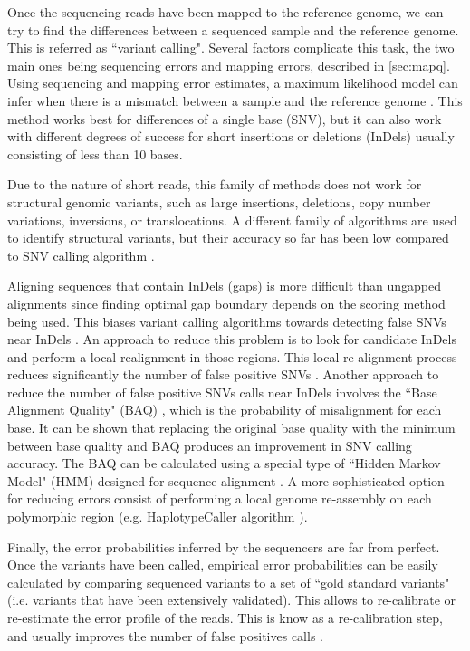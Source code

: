 Once the sequencing reads have been mapped to the reference genome, we can try to find the differences between a sequenced sample and the reference genome.  This is referred as  ``variant calling".  Several factors complicate this task, the two main ones being sequencing errors and mapping errors, described in \ref{sec:mapq}.  Using sequencing and mapping error estimates, a maximum likelihood model can infer when there is a mismatch between a sample and the reference genome \cite{li2008mapping}.  This method works best for differences of a single base (SNV), but it can also work with different degrees of success for short insertions or deletions (InDels) usually consisting of less than 10 bases.

Due to the nature of short reads, this family of methods does not work for structural genomic variants, such as large insertions, deletions, copy number variations, inversions, or translocations.  A different family of algorithms are used to identify structural variants, but their accuracy so far has been low compared to SNV calling algorithm \cite{o2013low}.

Aligning sequences that contain InDels (gaps) is more difficult than ungapped alignments since finding optimal gap boundary depends on the scoring method being used. This biases variant calling algorithms towards detecting false SNVs near InDels \cite{depristo2011framework}.  An approach to reduce this problem is to look for candidate InDels and perform a local realignment in those regions.  This local re-alignment process reduces significantly the number of false positive SNVs \cite{depristo2011framework}. Another approach to reduce the number of false positive SNVs calls near InDels involves the ``Base Alignment Quality" (BAQ) \cite{li2011improving}, which is the probability of misalignment for each base.  It can be shown that replacing the original base quality with the minimum between base quality and BAQ produces an improvement in SNV calling accuracy.  The BAQ can be calculated using a special type of ``Hidden Markov Model" (HMM) designed for sequence alignment \cite{li2011improving, durbin1998biological}. A more sophisticated option for reducing errors consist of performing a local genome re-assembly on each polymorphic region (e.g. HaplotypeCaller algorithm \cite{GATK}).

Finally, the error probabilities inferred by the sequencers are far from perfect.  Once the variants have been called, empirical error probabilities can be easily calculated \cite{mckenna2010genome} by comparing sequenced variants to a set of ``gold standard variants" (i.e. variants that have been extensively validated).  This allows to re-calibrate or re-estimate the error profile of the reads.  This is know as a re-calibration step, and usually improves the number of false positives calls \cite{depristo2011framework}.


